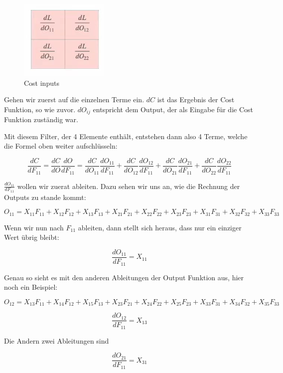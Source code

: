 \documentclass[12pt]{article}
\begin{document}

\begin{figure}[H]
\centering
\includegraphics[scale=0.80]{./Images/TemporaryPlaceholders/Bildschirmfoto vom 2024-05-20 17-15-41.png}
\caption{Cost inputs}
\label{Cost inputs}
\end{figure}

Gehen wir zuerst auf die einzelnen Terme ein. $dC$ ist das Ergebnis der Cost Funktion, so wie zuvor. $dO_{ij}$ entspricht dem Output, der als Eingabe für die Cost Funktion zuständig war.

Mit diesem Filter, der 4 Elemente enthält, entstehen dann also 4 Terme, welche die Formel oben weiter aufschlüsseln:

$$
\frac{dC}{dF_{11}} = 
\frac{dC} {dO} \frac{dO} {dF_{11}}= 
\frac{dC} {dO_{11}} \frac{dO_{11}} {dF_{11}}+
\frac{dC} {dO_{12}} \frac{dO_{12}} {dF_{11}}+
\frac{dC} {dO_{21}} \frac{dO_{21}} {dF_{11}}+
\frac{dC} {dO_{22}} \frac{dO_{22}} {dF_{11}}
$$

$\frac{dO_{11}} {dF_{11}}$ wollen wir zuerat ableiten. Dazu sehen wir uns an, wie die Rechnung der Outputs zu stande kommt:

$$
O_{11} = X_{11}F_{11}+X_{12}F_{12}+X_{13}F_{13}+X_{21}F_{21}+X_{22}F_{22}+X_{23}F_{23}+X_{31}F_{31}+X_{32}F_{32}+X_{33}F_{33}
$$

Wenn wir nun nach $F_{11}$ ableiten, dann stellt sich heraus, dass nur ein einziger Wert übrig bleibt:

$$\frac{dO_{11}} {dF_{11}} = X_{11}$$

Genau so sieht es mit den anderen Ableitungen der Output Funktion aus, hier noch ein Beispiel:

$$
O_{12} = X_{13}F_{11}+X_{14}F_{12}+X_{15}F_{13}+X_{23}F_{21}+X_{24}F_{22}+X_{25}F_{23}+X_{33}F_{31}+X_{34}F_{32}+X_{35}F_{33}
$$

$$\frac{dO_{12}} {dF_{11}} = X_{13}$$

Die Andern zwei Ableitungen sind


$$\frac{dO_{21}} {dF_{11}} = X_{31}$$
\end{document}

